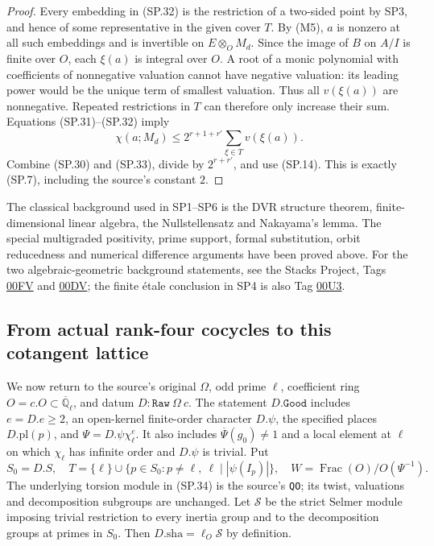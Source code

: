 \begin{proof}
Every embedding in (SP.32) is the restriction of a two-sided point
by SP3, and hence of some representative in the given cover $T$.
By (M5), $a$ is nonzero at all such embeddings and is invertible on
$E\otimes_OM_d$.  Since the image of $B$ on $A/I$ is finite over
$O$, each $\xi(a)$ is integral over $O$.  A root of a monic
polynomial with coefficients of nonnegative valuation cannot have
negative valuation: its leading power would be the unique term
of smallest valuation.  Thus all $v(\xi(a))$ are nonnegative.
Repeated restrictions in $T$ can therefore only increase their
sum.  Equations (SP.31)--(SP.32) imply
\[
            \chi(a;M_d)\le
                    2^{r+1+r'}\sum_{\xi\in T}v(\xi(a)).
 \tag{SP.33}
\]
Combine (SP.30) and (SP.33), divide by $2^{r+r'}$, and use (SP.14).
This is exactly (SP.7), including the source's constant $2$.
\end{proof}

The classical background used in SP1--SP6 is the DVR structure
theorem, finite-dimensional linear algebra, the Nullstellensatz and
Nakayama's lemma.  The special multigraded positivity, prime support,
formal substitution, orbit reducedness and numerical difference
arguments have been proved above.  For the two algebraic-geometric
background statements, see the Stacks Project, Tags
\href{https://stacks.math.columbia.edu/tag/00FV}{00FV} and
\href{https://stacks.math.columbia.edu/tag/00DV}{00DV}; the finite
\'etale conclusion in SP4 is also Tag
\href{https://stacks.math.columbia.edu/tag/00U3}{00U3}.

\subsection{From actual rank-four cocycles to this cotangent lattice}

We now return to the source's original $\Omega$, odd prime $\ell$,
coefficient ring $O=c.O\subset\overline{\mathbb Q}_\ell$, and datum
$D:\texttt{Raw}\ \Omega\ c$.  The statement $D.\texttt{Good}$
includes $e=D.e\ge2$, an open-kernel finite-order character $D.\psi$,
the specified places $D.\mathrm{pl}(p)$, and
$\Psi=D.\psi\chi_\ell^e$.  It also includes
$\overline\Psi(g_0)\ne1$ and a local element at $\ell$ on which
$\chi_\ell$ has infinite order and $D.\psi$ is trivial.
Put
\[
 S_0=D.S,\quad
 T=\{\ell\}\cup\{p\in S_0:p\ne\ell,
                      \ \ell\mid|\psi(I_p)|\},\quad
 W=\operatorname{Frac}(O)/O(\Psi^{-1}).
 \tag{SP.34}
\]
The underlying torsion module in (SP.34) is the source's
\texttt{QO}; its twist, valuations and decomposition subgroups are
unchanged.  Let $\mathcal S$ be the strict Selmer module imposing
trivial restriction to every inertia group and to the decomposition
groups at primes in $S_0$.  Then
$D.\mathrm{sha}=\ell_O\mathcal S$ by definition.


